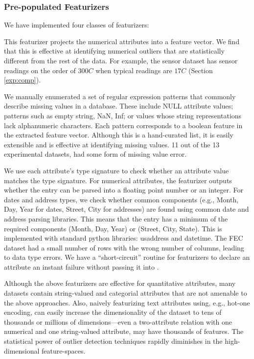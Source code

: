 \subsubsection{Pre-populated Featurizers}
\noindent We have implemented four classes of featurizers:

 This featurizer projects the numerical attributes into a feature vector.  We find that this is effective at identifying numerical outliers that are statistically different from the rest of the data. For example, the sensor dataset has sensor readings on the order of $300C$ when typical readings are $17C$ (Section \ref{exp:comp}).

  We manually enumerated a set of regular expression patterns that commonly describe missing values in a database.  These include \textsf{NULL} attribute values; patterns such as empty string, NaN, Inf; or values whose string representations lack alphanumeric characters. Each pattern corresponds to a boolean feature in the extracted feature vector.   Although this is a hand-curated list, it is easily extensible and is effective at identifying missing values. 11 out of the 13 experimental datasets, had some form of missing value error.

 We use each attribute's type signature to check whether an attribute value matches the type signature.  For numerical attributes, the featurizer outputs whether the entry can be parsed into a floating point number or an integer. For dates and address types, we check whether common components (e.g., Month, Day, Year for dates, Street, City for addresses) are found using common date and address parsing libraries.   This means that the entry has a minimum of the required components (Month, Day, Year) or (Street, City, State).  This is implemented with standard python libraries: \textsf{usaddress} and \textsf{datetime}. The FEC dataset had a small number of rows with the wrong number of columns, leading to data type errors. 
We have a ``short-circuit'' routine for featurizers to declare an attribute an instant failure without passing it into \detectlib.

Although the above featurizers are effective for quantitative attributes, many datasets contain string-valued and categorial attributes that are not amenable to the above approaches.  Also, naively featurizing text attributes using, e.g., hot-one encoding, can easily increase the dimensionality of the dataset to tens of thousands or millions of dimensions---even a two-attribute relation with one numerical and one string-valued attribute, may have thousands of features.  The statistical power of outlier detection techniques rapidly diminishes in the high-dimensional feature-spaces.

